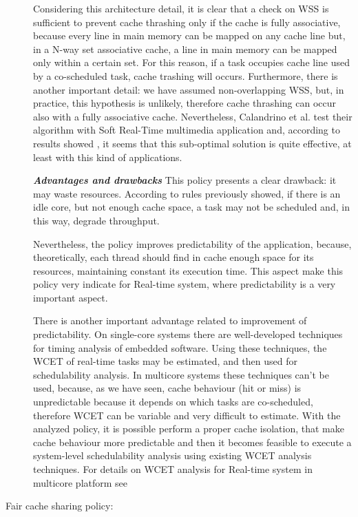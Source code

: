 \begin{description}
Considering this architecture detail, it is clear that a check on WSS is sufficient to prevent cache thrashing only if the cache is fully associative, 
because every line in main memory can be mapped on any cache line but, in a N-way set associative cache, a line in main memory can be mapped only within a 
certain set. For this reason, if a task occupies cache line used by a co-scheduled task, cache trashing will occurs. Furthermore, there is another 
important detail: we have assumed non-overlapping WSS, but, in practice, this hypothesis is unlikely, therefore cache thrashing can occur also with a 
fully associative cache. Nevertheless, Calandrino et al. test their algorithm with Soft Real-Time multimedia application and, according to results showed 
\cite{calandro}, it seems that this sub-optimal solution is quite effective, at least with this kind of applications.

\textbf{\textit{Advantages and drawbacks}} This policy presents a clear drawback: it may waste resources. According to rules previously showed, if there 
is an idle core, but not enough cache space, a task may not be scheduled and, in this way, degrade throughput. 

Nevertheless, the policy improves predictability of the application, because, theoretically, each thread should find in cache enough space for its 
resources, maintaining constant its execution time. This aspect make this policy very indicate for Real-time system, where predictability is a very 
important aspect.

There is another important advantage related to improvement of predictability. On single-core systems there are well-developed techniques for timing 
analysis of embedded software. Using these techniques, the WCET of real-time tasks may be estimated, and then used for schedulability analysis. 
In multicore systems these techniques can't be used, because, as we have seen, cache behaviour (hit or miss) is unpredictable because it depends on which 
tasks are co-scheduled, therefore WCET can be variable and very difficult to estimate. With the analyzed policy, it is possible perform a proper cache 
isolation, that make cache behaviour more predictable and then it becomes feasible to execute a system-level schedulability analysis using existing WCET 
analysis techniques. For details on WCET analysis for Real-time system in multicore platform see \cite{guann}


\item[Fair cache sharing policy:]


\end{description}
